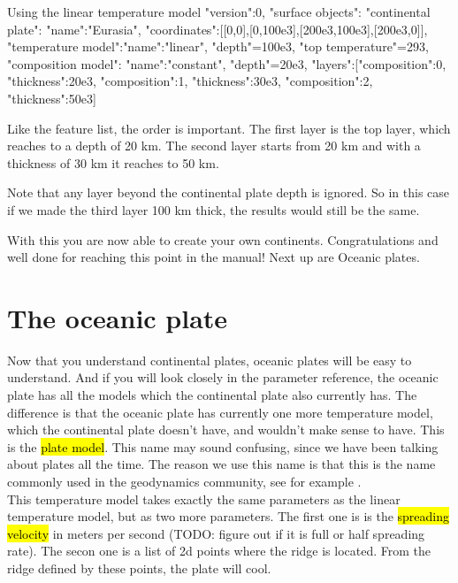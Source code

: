 \documentclass{book}
\begin{document}
\begin{bashcode}{Using the linear temperature model}
"version":0,
"surface objects":
{
  "continental plate":
  {
    "name":"Eurasia",
    "coordinates":[[0,0],[0,100e3],[200e3,100e3],[200e3,0]],
    "temperature model":{"name":"linear", "depth"=100e3, "top temperature"=293},
    "composition model":
    {
      "name":"constant", "depth"=20e3, 
      "layers":[{"composition":0, "thickness":20e3},
                 {"composition":1, "thickness":30e3},
                 {"composition":2, "thickness":50e3}]
      }
  }
}
\end{bashcode}

Like the feature list, the order is important. The first layer is the top layer, which reaches to a depth of 20 km. The second layer starts from 20 km and with a thickness of 30 km it reaches to 50 km. 

\begin{remark}
Note that any layer beyond the continental plate depth is ignored. So in this case if we made the third layer 100 km thick, the results would still be the same.
\end{remark}

With this you are now able to create your own continents. Congratulations and well done for reaching this point in the manual! Next up are Oceanic plates.

\section{The oceanic plate}
Now that you understand continental plates, oceanic plates will be easy to understand. And if you will look closely in the parameter reference, the oceanic plate has all the models which the continental plate also currently has. The difference is that the oceanic plate has currently one more temperature model, which the continental plate doesn't have, and wouldn't make sense to have. This is the \hl{plate model}. This name may sound confusing, since we have been talking about plates all the time. The reason we use this name is that this is the name commonly used in the geodynamics community, see for example \cite{fowler2005}. 
\\
This temperature model takes exactly the same parameters as the linear temperature model, but as two more parameters. The first one is is the \hl{spreading velocity} in meters per second (TODO: figure out if it is full or half spreading rate). The secon one is a list of 2d points where the ridge is located. From the ridge defined by these points, the plate will cool.
\end{document}

